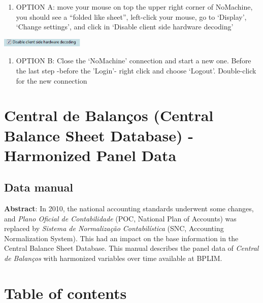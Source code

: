 \documentclass[]{book}
\providecommand{\tightlist}{%
  \setlength{\itemsep}{0pt}\setlength{\parskip}{0pt}}
\begin{document}
\begin{enumerate}
\def\labelenumi{\arabic{enumi}.}
\setcounter{enumi}{4}
\tightlist
\item
  {OPTION A}: move your mouse on top the upper right
  corner of NoMachine, you should see a ``folded like sheet'',
  left-click your mouse, go to `Display', `Change settings', and click
  in `Disable client side hardware decoding'
\end{enumerate}

\includegraphics[width=1.56522in,height=0.15in]{./media/image48.png}

\begin{enumerate}
\def\labelenumi{\arabic{enumi}.}
\setcounter{enumi}{5}
\tightlist
\item
  {OPTION B}: Close the `NoMachine' connection and start a
  new one. Before the last step -before the 'Login'- right click and
  choose `Logout'. Double-click for the new connection
\end{enumerate}

\hypertarget{central-de-balancos-central-balance-sheet-database---harmonized-panel-data}{%
\chapter{Central de Balanços (Central Balance Sheet Database) - Harmonized Panel Data}\label{central-de-balancos-central-balance-sheet-database---harmonized-panel-data}}

\hypertarget{data-manual}{%
\section{Data manual}\label{data-manual}}

\textbf{Abstract}: In 2010, the national accounting standards underwent some changes, and \emph{Plano Oficial de Contabilidade} (POC, National Plan of Accounts) was replaced by \emph{Sistema de Normalização Contabilística} (SNC, Accounting Normalization System). This had an impact on the base information in the Central Balance Sheet Database. This manual describes the panel data of \emph{Central de Balanços} with harmonized variables over time available at BPLIM.

\hypertarget{table-of-contents}{%
\chapter{Table of contents}\label{table-of-contents}}
\end{document}
